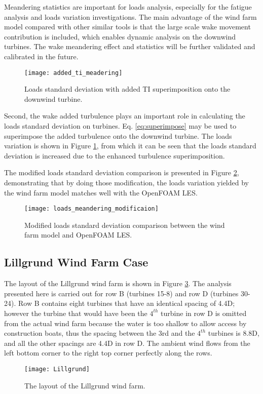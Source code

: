 \documentclass{umthesis}
\begin{document}
Meandering statistics are important for loads analysis, especially for the fatigue analysis and loads variation investigations. The main advantage of the wind farm model compared with other similar tools is that the large scale wake movement contribution is included, which enables dynamic analysis on the downwind turbines. The wake meandering effect and statistics will be further validated and calibrated in the future.

\begin{figure}
  \centering
  \texttt{[image: added\_ti\_meadering]}
  \caption{Loads standard deviation with added TI superimposition onto the downwind turbine.}\label{fig:added_ti_meadering}
\end{figure}

Second, the wake added turbulence plays an important role in calculating the loads standard deviation on turbines. Eq. \ref{eq:superimpose} may be used to superimpose the added turbulence onto the downwind turbine. The loads variation is shown in Figure \ref{fig:added_ti_meadering}, from which it can be seen that the loads standard deviation is increased due to the enhanced turbulence superimposition.

The modified loads standard deviation comparison is presented in Figure \ref{fig:loads_meandering_modificaion}, demonstrating that by doing those modification, the loads variation yielded by the wind farm model matches well with the OpenFOAM LES.
\begin{figure}
  \centering
  \texttt{[image: loads\_meandering\_modificaion]}
  \caption{Modified loads standard deviation comparison between the wind farm model and OpenFOAM LES.}\label{fig:loads_meandering_modificaion}
\end{figure}



\subsection{Lillgrund Wind Farm Case}
The layout of the Lillgrund wind farm is shown in Figure \ref{fig:Lillgrund}. The analysis presented here is carried out for row B (turbines 15-8) and row D (turbines 30-24). Row B contains eight turbines that have an identical spacing of 4.4D; however the turbine that would have been the $4^{th}$ turbine in row D is omitted from the actual wind farm because the water is too shallow to allow access by construction boats, thus the spacing between the 3rd and the $4^{th}$ turbines is 8.8D, and all the other spacings are 4.4D in row D. The ambient wind flows from the left bottom corner to the right top corner perfectly along the rows.
\begin{figure}
  \centering
  \texttt{[image: Lillgrund]}
  \caption{The layout of the Lillgrund wind farm.}\label{fig:Lillgrund}
\end{figure}
\end{document}
